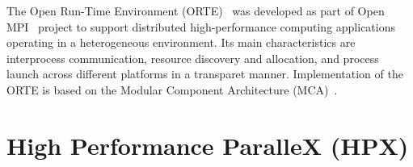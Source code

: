 The Open Run-Time Environment (ORTE)~\cite{Castain2008153} was developed as part of Open MPI~\cite{gabriel04:_open_mpi} project to support distributed high-performance computing applications operating in a heterogeneous environment. Its main characteristics are interprocess communication, resource discovery and allocation, and process launch across different platforms in a transparet manner. Implementation of the ORTE is based on the Modular Component Architecture (MCA)~\cite{gabriel04:_open_mpi}.


\section{High Performance ParalleX (HPX)}
\label{sec:Background}




